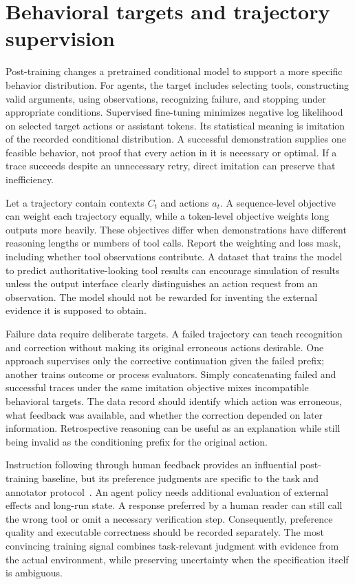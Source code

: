 \section{Behavioral targets and trajectory supervision}
\label{sec:C08:sft}
Post-training changes a pretrained conditional model to support a more specific behavior distribution. For agents, the target includes selecting tools, constructing valid arguments, using observations, recognizing failure, and stopping under appropriate conditions. Supervised fine-tuning minimizes negative log likelihood on selected target actions or assistant tokens. Its statistical meaning is imitation of the recorded conditional distribution. A successful demonstration supplies one feasible behavior, not proof that every action in it is necessary or optimal. If a trace succeeds despite an unnecessary retry, direct imitation can preserve that inefficiency.

Let a trajectory contain contexts $C_t$ and actions $a_t$. A sequence-level objective can weight each trajectory equally, while a token-level objective weights long outputs more heavily. These objectives differ when demonstrations have different reasoning lengths or numbers of tool calls. Report the weighting and loss mask, including whether tool observations contribute. A dataset that trains the model to predict authoritative-looking tool results can encourage simulation of results unless the output interface clearly distinguishes an action request from an observation. The model should not be rewarded for inventing the external evidence it is supposed to obtain.

Failure data require deliberate targets. A failed trajectory can teach recognition and correction without making its original erroneous actions desirable. One approach supervises only the corrective continuation given the failed prefix; another trains outcome or process evaluators. Simply concatenating failed and successful traces under the same imitation objective mixes incompatible behavioral targets. The data record should identify which action was erroneous, what feedback was available, and whether the correction depended on later information. Retrospective reasoning can be useful as an explanation while still being invalid as the conditioning prefix for the original action.

Instruction following through human feedback provides an influential post-training baseline, but its preference judgments are specific to the task and annotator protocol~\cite{ouyang2022instructgpt}. An agent policy needs additional evaluation of external effects and long-run state. A response preferred by a human reader can still call the wrong tool or omit a necessary verification step. Consequently, preference quality and executable correctness should be recorded separately. The most convincing training signal combines task-relevant judgment with evidence from the actual environment, while preserving uncertainty when the specification itself is ambiguous.

